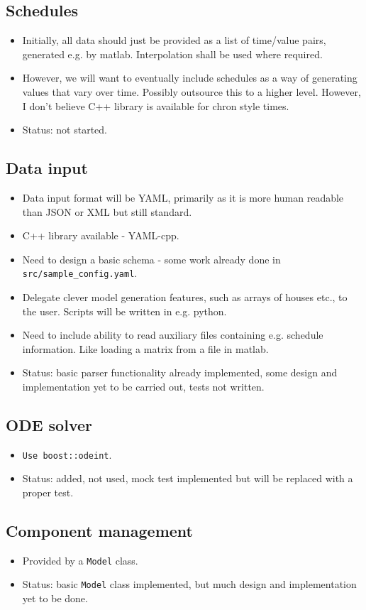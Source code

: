 \documentclass[12pt]{article}
\newcommand{\itm}[1]{\begin{itemize}#1\end{itemize}}
\begin{document}
\subsection{Schedules}
\itm{
	\item Initially, all data should just be provided as a list of time/value pairs, generated e.g. by matlab. Interpolation shall be used where required.
	\item However, we will want to eventually include schedules as a way of generating values that vary over time. Possibly outsource this to a higher level. However, I don't believe C++ library is available for chron style times.
	\item Status: not started.
}

\subsection{Data input}
\itm{
	\item Data input format will be YAML, primarily as it is more human readable than JSON or XML but still standard.
	\item C++ library available - YAML-cpp.
	\item Need to design a basic schema - some work already done in \texttt{src/sample\_config.yaml}.
	\item Delegate clever model generation features, such as arrays of houses etc., to the user. Scripts will be written in e.g. python.
	\item Need to include ability to read auxiliary files containing e.g. schedule information. Like loading a matrix from a file in matlab.
	\item Status: basic parser functionality already implemented, some design and implementation yet to be carried out, tests not written.
}

\subsection{ODE solver}
\itm{
	\item \texttt{Use boost::odeint}.
	\item Status: added, not used, mock test implemented but will be replaced with a proper test.
}

\subsection{Component management}
\itm{
	\item Provided by a \texttt{Model} class. 
	\item Status: basic \texttt{Model} class implemented, but much design and implementation yet to be done.
}
\end{document}
